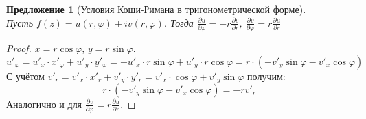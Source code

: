 \documentclass[11pt,openany,a4paper]{scrartcl}
\theoremstyle{plain}
\newtheorem{proposition}[theorem]{Предложение}
\theoremstyle{definition}
\newcommand{\pd}[2]{\frac{\partial #1}{\partial #2}}
\begin{document}
\begin{proposition}[Условия Коши-Римана в тригонометрической форме]
\mbox{}\\
	Пусть $f(z) = u(r, \varphi) + iv(r, \varphi)$. Тогда $\pd{u}{\varphi} = -r\pd{v}{r}$,
	$\pd{v}{\varphi} = r\pd{u}{r}$
\end{proposition}
\begin{proof}
	$x = r\cos \varphi$, $y = r\sin \varphi$.
	$$
	u'_\varphi = u'_x\cdot x'_\varphi + u'_y\cdot y'_\varphi = -u'_x \cdot r\sin \varphi +
	u'_y \cdot r\cos \varphi = r\cdot(-v'_y\sin \varphi - v'_x\cos \varphi)
	$$
	С учётом $v'_r = v'_x \cdot x'_r + v'_y \cdot y'_r = v'_x\cdot \cos \varphi + v'_y \sin \varphi$
	получим: 
	$$
	r\cdot(-v'_y\sin \varphi - v'_x\cos \varphi) = -rv'_r
	$$
	Аналогично и для $\pd{v}{\varphi} = r\pd{u}{r}$.
\end{proof}
\end{document}
